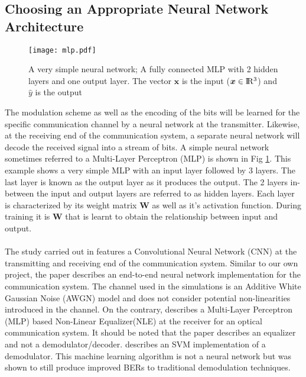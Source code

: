 \subsection{Choosing an Appropriate Neural Network Architecture}

\begin{figure}[H]
	\centering
	\texttt{[image: mlp.pdf]}
	\caption{A very simple neural network; A fully connected MLP with 2 hidden layers and one output layer. The vector $\boldsymbol{x}$ is the input ($\boldsymbol{x} \in \rm I\!R^{3}$) and $\hat{y}$ is the output}
	\label{fig:mlp}	
\end{figure}

The modulation scheme as well as the encoding of the bits will be learned for the specific communication channel by a neural network at the transmitter. Likewise, at the receiving end of the communication system, a separate neural network will decode the received signal into a stream of bits. A simple neural network sometimes referred to a Multi-Layer Perceptron (MLP) is shown in Fig \ref{fig:mlp}. This example shows a very simple MLP with an input layer followed by 3 layers. The last layer is known as the output layer as it produces the output. The 2 layers in-between the input and output layers are referred to as hidden layers. Each layer is characterized by its weight matrix $\boldsymbol{W}$ as well as it's activation function. During training it is $\boldsymbol{W}$ that is learnt to obtain the relationship between input and output.
\\
\\
The study carried out in \autocite{8664650} features a Convolutional Neural Network (CNN) at the transmitting and receiving end of the communication system. Similar to our own project, the paper describes an end-to-end neural network implementation for the communication system. The channel used in the simulations is an Additive White Gaussian Noise (AWGN) model and does not consider potential non-linearities introduced in the channel. On the contrary, \autocite{6975096} describes a Multi-Layer Perceptron (MLP) based Non-Linear Equalizer(NLE) at the receiver for an optical communication system.  It should be noted that the paper describes an equalizer and not a demodulator/decoder. \autocite{8114893} describes an SVM implementation of a demodulator. This machine learning algorithm is not a neural network but was shown to still produce improved BERs to traditional demodulation techniques. 
\\
\\
